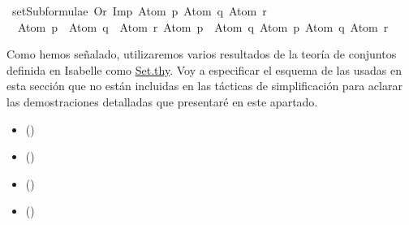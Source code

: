 \begin{isabellebody}
\isanewline
{}\isamarkupfalse%
\ {\isachardoublequoteopen}setSubformulae\ {\isacharparenleft}Or\ {\isacharparenleft}Imp\ {\isacharparenleft}Atom\ p{\isacharparenright}\ {\isacharparenleft}Atom\ q{\isacharparenright}{\isacharparenright}\ {\isacharparenleft}Atom\ r{\isacharparenright}{\isacharparenright}\ {\isacharequal}\ \isanewline
\ \ {\isacharbraceleft}{\isacharparenleft}Atom\ p\ \isactrlbold {\isasymrightarrow}\ Atom\ q{\isacharparenright}\ \isactrlbold {\isasymor}\ Atom\ r{\isacharcomma}\ Atom\ p\ \isactrlbold {\isasymrightarrow}\ Atom\ q{\isacharcomma}\ Atom\ p{\isacharcomma}\ Atom\ q{\isacharcomma}\ Atom\ r{\isacharbraceright}{\isachardoublequoteclose}\isanewline
\ %
\isadelimproof
%
\endisadelimproof
%
\isatagproof
%
\endisatagproof
{\isafoldproof}%
%
\isadelimproof
%
\endisadelimproof
%
\begin{isamarkuptext}%
Como hemos señalado, utilizaremos varios resultados de la teoría de conjuntos definida en 
Isabelle como \href{https://n9.cl/qatp}{Set.thy}.
Voy a especificar el esquema de las usadas en esta sección que no están incluidas en las tácticas de
simplificación para aclarar las demostraciones detalladas que presentaré en este apartado.\\
 \begin{itemize}
  \item[]  \hfill ()
  \end{itemize}

 \begin{itemize}
  \item[]  \hfill ()
  \end{itemize}

 \begin{itemize}
  \item[]  \hfill ()
  \end{itemize}

 \begin{itemize}
  \item[]  \hfill ()
  \end{itemize}


\end{isamarkuptext}
\end{isabellebody}
